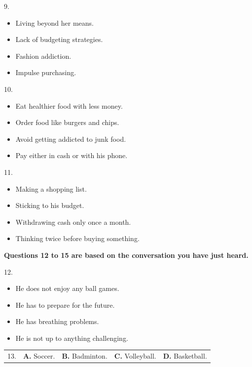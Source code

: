 \documentclass[UTF8,11pt]{ctexart}
\begin{document}
9.


\begin{itemize}[leftmargin=2em,itemsep=.2em,topsep=.4em]\item[A.] Living beyond her means.
\item[B.] Lack of budgeting strategies.
\item[C.] Fashion addiction.
\item[D.] Impulse purchasing.
\end{itemize}

10.


\begin{itemize}[leftmargin=2em,itemsep=.2em,topsep=.4em]\item[A.] Eat healthier food with less money.
\item[B.] Order food like burgers and chips.
\item[C.] Avoid getting addicted to junk food.
\item[D.] Pay either in cash or with his phone.
\end{itemize}

11.


\begin{itemize}[leftmargin=2em,itemsep=.2em,topsep=.4em]\item[A.] Making a shopping list.
\item[B.] Sticking to his budget.
\item[C.] Withdrawing cash only once a month.
\item[D.] Thinking twice before buying something.
\end{itemize}

\textbf{Questions 12 to 15 are based on the conversation you have just heard.}


12.


\begin{itemize}[leftmargin=2em,itemsep=.2em,topsep=.4em]\item[A.] He does not enjoy any ball games.
\item[B.] He has to prepare for the future.
\item[C.] He has breathing problems.
\item[D.] He is not up to anything challenging.
\end{itemize}

\noindent\begin{tabularx}{\linewidth}{@{}lXXXX@{}}13. & \textbf{A.} Soccer. & \textbf{B.} Badminton. & \textbf{C.} Volleyball. & \textbf{D.} Basketball.\\\end{tabularx}\par
\end{document}
